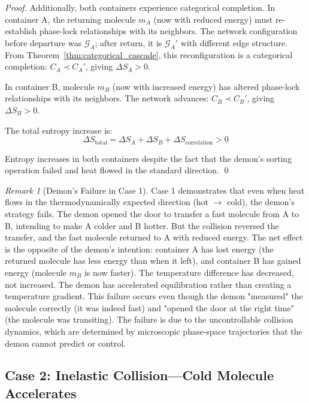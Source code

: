 \documentclass[12pt,a4paper]{article}
\theoremstyle{definition}
\theoremstyle{remark}
\newtheorem{remark}[theorem]{Remark}
\newcommand{\phaselockgraph}{\mathcal{G}}
\begin{document}
\begin{proof}
Additionally, both containers experience categorical completion. In container A, the returning molecule $m_A$ (now with reduced energy) must re-establish phase-lock relationships with its neighbors. The network configuration before departure was $\phaselockgraph_A$; after return, it is $\phaselockgraph_A'$ with different edge structure. From Theorem~\ref{thm:categorical_cascade}, this reconfiguration is a categorical completion: $C_A \prec C_A'$, giving $\Delta S_A > 0$.

In container B, molecule $m_B$ (now with increased energy) has altered phase-lock relationships with its neighbors. The network advances: $C_B \prec C_B'$, giving $\Delta S_B > 0$.

The total entropy increase is:
\begin{equation}
\Delta S_{\text{total}} = \Delta S_A + \Delta S_B + \Delta S_{\text{correlation}} > 0
\end{equation}

Entropy increases in both containers despite the fact that the demon's sorting operation failed and heat flowed in the standard direction. \qed
\end{proof}

\begin{remark}[Demon's Failure in Case 1]
\label{rem:demon_failure_case1}
Case 1 demonstrates that even when heat flows in the thermodynamically expected direction (hot $\to$ cold), the demon's strategy fails. The demon opened the door to transfer a fast molecule from A to B, intending to make A colder and B hotter. But the collision reversed the transfer, and the fast molecule returned to A with reduced energy. The net effect is the opposite of the demon's intention: container A has lost energy (the returned molecule has less energy than when it left), and container B has gained energy (molecule $m_B$ is now faster). The temperature difference has decreased, not increased. The demon has accelerated equilibration rather than creating a temperature gradient. This failure occurs even though the demon "measured" the molecule correctly (it was indeed fast) and "opened the door at the right time" (the molecule was transiting). The failure is due to the uncontrollable collision dynamics, which are determined by microscopic phase-space trajectories that the demon cannot predict or control.
\end{remark}

\subsection{Case 2: Inelastic Collision—Cold Molecule Accelerates}
\end{document}
